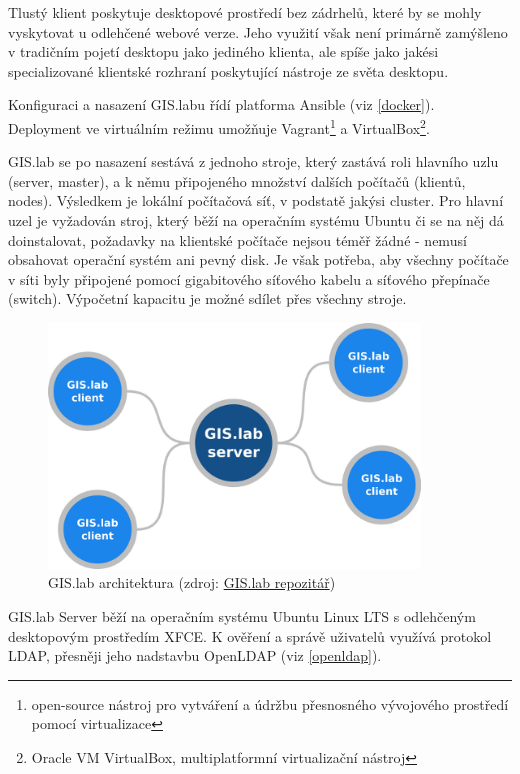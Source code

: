 Tlustý klient poskytuje desktopové prostředí bez zádrhelů, které by se
mohly vyskytovat u odlehčené webové verze. Jeho využití však není primárně
zamýšleno v tradičním pojetí desktopu jako jediného klienta, ale spíše
jako jakési specializované klientské rozhraní poskytující nástroje ze
světa desktopu.

Konfiguraci a nasazení GIS.labu řídí platforma Ansible (viz
\ref{docker}). Deployment ve virtuálním režimu umožňuje
Vagrant\footnote{open-source nástroj pro vytváření a údržbu
  přesnosného vývojového prostředí pomocí virtualizace} a
VirtualBox\footnote{Oracle VM VirtualBox, multiplatformní
  virtualizační nástroj}.

GIS.lab se po nasazení sestává z jednoho stroje, který zastává roli
hlavního uzlu (server, master), a k němu připojeného množství dalších počítačů
(klientů, nodes). Výsledkem je lokální počítačová síť, v podstatě jakýsi cluster.
Pro hlavní uzel je vyžadován stroj, který běží na operačním systému
Ubuntu či se na něj dá doinstalovat, požadavky na klientské počítače nejsou téměř žádné - nemusí
obsahovat operační systém ani pevný disk. Je však potřeba, aby všechny
počítače v síti byly připojené pomocí gigabitového síťového kabelu a
síťového přepínače (switch). Výpočetní kapacitu je možné sdílet přes všechny stroje.

\begin{figure}[H] \centering
    \includegraphics[width=280pt]{./pictures/gislab-architecture.png}
    \caption[GIS.lab architektura]{GIS.lab architektura (zdroj:
	\href{https://github.com/gislab-npo/gislab-doc/blob/master/img/general/gislab-architecture.png}{GIS.lab repozitář})}
	\label{fig:gislab-architecture}
\end{figure}

GIS.lab Server běží na operačním systému Ubuntu Linux LTS s odlehčeným
desktopovým prostředím XFCE.  K ověření a správě uživatelů využívá
protokol LDAP, přesněji jeho nadstavbu OpenLDAP (viz \ref{openldap}).

